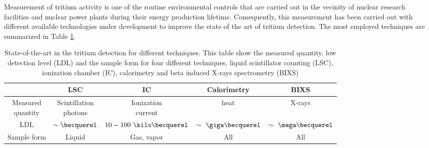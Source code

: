 Measurement of tritium activity is one of the routine environmental controls that are carried out in the vecinity of nuclear research facilities and nuclear power plants during their energy production lifetime. Consequently, this measurement has been carried out with different available technologies under development to improve the state of the art of tritium detection. The most employed techniques are summarized in Table \ref{tab:DifferentThecnics}.

\begin{table}[htbp]
\begin{center}
\begin{tabular}{|c|c|c|c|c|}
\hline
 & LSC & IC & Calorimetry & BIXS\\
\hline \hline \hline
\parbox{5em}{\centering Measured\\ quantity} & \parbox{5em}{\centering Scintillation\\ photons} &  \parbox{5em}{\centering Ionization\\ current} & heat & X-rays\\ \hline
LDL & $\sim\becquerel$ & $10-100~\kilo\becquerel$ & $\sim~\giga\becquerel$ & $\sim~\mega\becquerel$ \\ \hline
Sample form & Liquid & Gas, vapor & All & All \\ \hline
\end{tabular}
\caption{State-of-the-art in the tritium detection for different techniques. This table show the measured quantity, low detection level (LDL) and the sample form for four different techniques, liquid scintillator counting (LSC), ionization chamber (IC), calorimetry and beta induced X-rays spectrometry (BIXS)}
\label{tab:DifferentThecnics}
\end{center}
\end{table}

